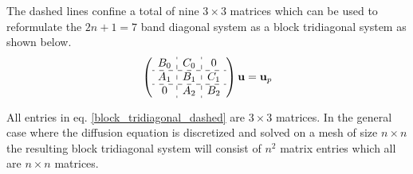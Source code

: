 \noindent The dashed lines confine a total of nine $3\times 3$ matrices which can be used to reformulate the $2n +1 = 7$ band diagonal system as a block tridiagonal system as shown below.
\begin{align}\label{block_tridiagonal_dashed}
 \left(\begin{array}{c : c : c }
        B_0 & C_0 &0  \\ \hdashline
        A_1 & B_1 & C_1 \\ \hdashline
        0& A_2 & B_2
       \end{array}\right)\mathbf{u} = \mathbf{u}_p
\end{align}

\noindent All entries in eq. \eqref{block_tridiagonal_dashed} are $3\times3$ matrices. 
In the general case where the diffusion equation is discretized and solved on a mesh of size $n\times n$ the resulting block tridiagonal system will consist of $n^2$ matrix entries which all are $n\times n$ matrices.
% 
% 

